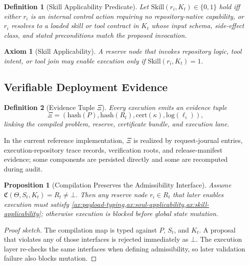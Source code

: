 \documentclass[11pt]{article}
\newtheorem{definition}{Definition}[section]
\newtheorem{axiom}{Axiom}[section]
\newtheorem{proposition}{Proposition}[section]
\theoremstyle{remark}
\newcommand{\Skill}{\mathrm{Skill}}
\begin{document}
\begin{definition}[Skill Applicability Predicate]
Let \(\Skill(r_i,K_t)\in\{0,1\}\) hold iff either \(r_i\) is an internal control action requiring no repository-native capability, or \(r_i\) resolves to a loaded skill or tool contract in \(K_t\) whose input schema, side-effect class, and stated preconditions match the proposed invocation.
\end{definition}

\begin{axiom}[Skill Applicability]\label{ax:skill-applicability}
A reserve node that invokes repository logic, tool intent, or tool join may enable execution only if \(\Skill(r_i,K_t)=1\).
\end{axiom}

\subsection{Verifiable Deployment Evidence}

\begin{definition}[Evidence Tuple \(\Xi\)]
Every execution emits an evidence tuple
\[
\Xi = (\mathrm{hash}(P), \mathrm{hash}(R_t), \mathrm{cert}(\kappa), \mathrm{log}(\ell_i)),
\]
linking the compiled problem, reserve, certificate bundle, and execution lane.
\end{definition}
In the current reference implementation, \(\Xi\) is realized by request-journal entries, execution-repository trace records, verification roots, and release-manifest evidence; some components are persisted directly and some are recomputed during audit.

\begin{proposition}[Compilation Preserves the Admissibility Interface]
Assume \(\mathfrak{C}(\Theta,S_t,K_t)=R_t\neq\bot\). Then any reserve node \(r_i \in R_t\) that later enables execution must satisfy \cref{ax:payload-typing,ax:soul-applicability,ax:skill-applicability}; otherwise execution is blocked before global state mutation.
\end{proposition}

\begin{proof}[Proof sketch]
The compilation map is typed against \(P\), \(S_t\), and \(K_t\). A proposal that violates any of those interfaces is rejected immediately as \(\bot\). The execution layer re-checks the same interfaces when defining admissibility, so later validation failure also blocks mutation.
\end{proof}
\end{document}
